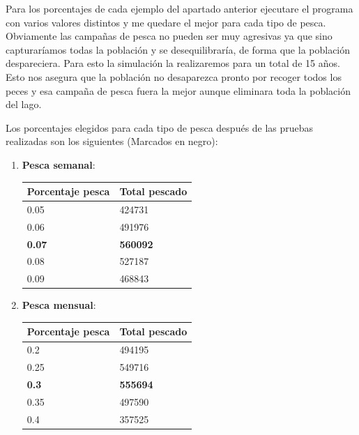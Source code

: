 \documentclass[]{article}
\begin{document}
Para los porcentajes de cada ejemplo del apartado anterior ejecutare el programa con varios valores distintos y me quedare el mejor para cada tipo de pesca. Obviamente las campañas de pesca no pueden ser muy agresivas ya que sino capturaríamos todas la población y se desequilibraría, de forma que la población despareciera. Para esto la simulación la realizaremos para un total de 15 años. Esto nos asegura que la población no desaparezca pronto por recoger todos los peces y esa campaña de pesca fuera la mejor aunque eliminara toda la población del lago. 

Los porcentajes elegidos para cada tipo de pesca después de las pruebas realizadas son los siguientes (Marcados en negro):

\begin{enumerate}
	\item \textbf{Pesca semanal}:
	\begin{table}[H]
		\begin{center}
			\begin{tabular}{|l|l|}
				\hline
				Porcentaje pesca & Total pescado\\
				\hline \hline
				0.05 & 424731
				\\ \hline
				0.06 & 491976
				\\ \hline
				\textbf{0.07} & \textbf{560092}
				\\ \hline
				0.08 & 527187
				\\ \hline
				0.09 & 468843
				\\ \hline
			\end{tabular}
			\label{tabla:sencilla}
		\end{center}
	\end{table}
	\item \textbf{Pesca mensual}: 
	\begin{table}[H]
		\begin{center}
			\begin{tabular}{|l|l|}
				\hline
				Porcentaje pesca & Total pescado\\
				\hline \hline
				0.2 & 494195
				\\ \hline
				0.25 & 549716
				\\ \hline
				\textbf{0.3} & \textbf{555694}
				\\ \hline
				0.35 & 497590
				\\ \hline
				0.4 & 357525
				\\ \hline
			\end{tabular}
			\label{tabla:sencilla}
		\end{center}

\end{table}
\end{enumerate}
\end{document}
